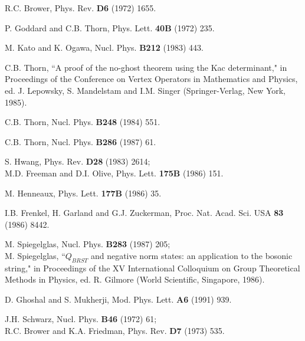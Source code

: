 \documentclass[a4paper,12pt]{article}
\begin{document}
\begin{thebibliography}{999}


R.C. Brower, Phys. Rev. {\bf D6} (1972) 1655.

P. Goddard and C.B. Thorn, Phys. Lett. {\bf 40B} (1972) 235.

M. Kato and K. Ogawa, Nucl. Phys. {\bf B212} (1983) 443.

C.B. Thorn, ``A proof of the no-ghost theorem using the Kac determinant,"
in Proceedings of the Conference on Vertex Operators
in Mathematics and Physics,
ed. J. Lepowsky, S. Mandelstam and I.M. Singer
(Springer-Verlag, New York, 1985).

C.B. Thorn, Nucl. Phys. {\bf B248} (1984) 551.

C.B. Thorn, Nucl. Phys. {\bf B286} (1987) 61.

S. Hwang, Phys. Rev. {\bf D28} (1983) 2614;\\
M.D. Freeman and D.I. Olive, Phys. Lett. {\bf 175B} (1986) 151.

M. Henneaux, Phys. Lett. {\bf 177B} (1986) 35.

I.B. Frenkel, H. Garland and G.J. Zuckerman, Proc. Nat. Acad. Sci. USA {\bf
83} (1986) 8442.

M. Spiegelglas, Nucl. Phys. {\bf B283} (1987) 205;\\
M. Spiegelglas, ``$Q_{BRST}$ and negative norm states:
an application to the bosonic string,"
in Proceedings of the XV International Colloquium
on Group Theoretical Methods in Physics,
ed. R. Gilmore (World Scientific, Singapore, 1986).

D. Ghoshal and S. Mukherji, Mod. Phys. Lett. {\bf A6} (1991) 939.

J.H. Schwarz, Nucl. Phys. {\bf B46} (1972) 61;\\
R.C. Brower and K.A. Friedman, Phys. Rev. {\bf D7} (1973) 535.


\end{thebibliography}
\end{document}
